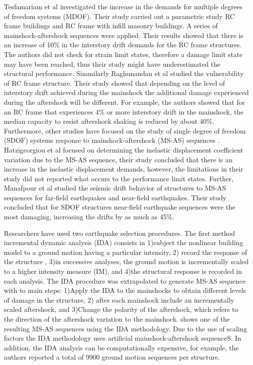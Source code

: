 Tesfamariam et al \cite{Tesfamariam2015} investigated the increase in the demands for multiple degrees of freedom systems (MDOF). Their study carried out a parametric study RC frame buildings and RC frame with infill masonry buildings. A series of mainshock-aftershock sequences were applied. Their results showed that there is an increase of 10\% in the interstory drift demands for the RC frame structures. The authors did not check for strain limit states, therefore a damage limit state may have been reached, thus their study might have underestimated the structural performance. Simmilarly Raghunandan et al \cite{Raghunandan2015} studied the vulnerability of RC frame structure. Their study showed that depending on the level of interstory drift achieved during the mainshock the additional damage experienced during the aftershock will be different. For example, the authors showed that for an RC frame that experiences 4\% or more interstory drift in the mainshock, the median capacity to resist aftershock shaking is reduced by about 40\%. Furthermore, other studies have focused on the study of single degree of freedom (SDOF) systems response to mainshock-aftershock (MS-AS) sequences \cite{Hatzigeorgiou2009}\cite{Manafpour2019}. Hatzigeorgiou et al focused on determining the inelastic displacement coefficient variation due to the MS-AS sequence, their study concluded that there is an increase in the inelastic displacement demands, however, the limitations in their study did not reported what occurs to the performance limit states. Further, Manafpour et al studied the seismic drift behavior of structures to MS-AS sequences for far-field earthquakes and near-field earthquakes. Their study concluded that for SDOF structures near-field earthquake sequences were the most damaging, increasing the drifts by as much as 45\%.

Researchers have used two earthquake selection procedures. The first method incremental dynamic analysis (IDA) consists in 1)subject the nonlinear building model to a ground motion having a particular intensity, 2) record the response of the structure \cite{Vamvatsikos2002}, 3)in successive analyses, the ground motion is incrementally scaled to a higher intensity measure (IM), and 4)the structural response is recorded in each analysis. The IDA procedure was extrapolated to generate MS-AS sequence with to main steps: 1)Apply the IDA to the mainshocks to obtain different levels of damage in the structure, 2) after each mainshock include an incrementally scaled aftershock, and 3)Change the polarity of the aftershock, which refers to the direction of the aftershock variation to the mainshock.  shows one of the resulting MS-AS sequences using the IDA methodology. Due to the use of scaling factors the IDA methodology uses artificial mainshock-aftershock sequenceS. In addition, the IDA analysis can be computationally expensive, for example, the authors reported a total of 9900 ground motion sequences per structure.

